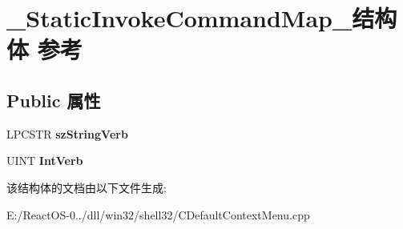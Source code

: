 \hypertarget{struct___static_invoke_command_map__}{}\section{\+\_\+\+Static\+Invoke\+Command\+Map\+\_\+结构体 参考}
\label{struct___static_invoke_command_map__}
\subsection*{Public 属性}
\begin{DoxyCompactItemize}
\item 
\mbox{\label{struct___static_invoke_command_map___ae450364ffcbdfca98d23652b51db19d7}} 
L\+P\+C\+S\+TR {\bfseries sz\+String\+Verb}
\item 
\mbox{\label{struct___static_invoke_command_map___a8dcf6efb078a2395581461168cd02f7e}} 
U\+I\+NT {\bfseries Int\+Verb}
\end{DoxyCompactItemize}


该结构体的文档由以下文件生成\+:\begin{DoxyCompactItemize}
\item 
E\+:/\+React\+O\+S-\/0../dll/win32/shell32/C\+Default\+Context\+Menu.\+cpp\end{DoxyCompactItemize}

